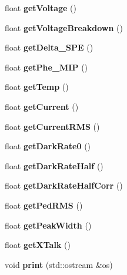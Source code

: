 \begin{DoxyCompactItemize}
\item 
float {\bfseries getVoltage} ()\label{classCALICE_1_1TilesItep_aafa1a1d65569c178442f2820be77b289}

\item 
float {\bfseries getVoltageBreakdown} ()\label{classCALICE_1_1TilesItep_a2010bc99a78518b307feee4257fd99d6}

\item 
float {\bfseries getDelta\_\-SPE} ()\label{classCALICE_1_1TilesItep_a993822f7f20966e669e13bdaacd6ef85}

\item 
float {\bfseries getPhe\_\-MIP} ()\label{classCALICE_1_1TilesItep_a35846842f8e7605fc8bb93bfb52c0f6c}

\item 
float {\bfseries getTemp} ()\label{classCALICE_1_1TilesItep_a404fc9ff07ba51ecf1399bed3ba4e80f}

\item 
float {\bfseries getCurrent} ()\label{classCALICE_1_1TilesItep_a455610d588f32d1db3d549dbdb141c11}

\item 
float {\bfseries getCurrentRMS} ()\label{classCALICE_1_1TilesItep_a19a98deda22ecd36e95a92b7e6b10470}

\item 
float {\bfseries getDarkRate0} ()\label{classCALICE_1_1TilesItep_a4337a0d37c55a087b0bdbfdd7e2193fc}

\item 
float {\bfseries getDarkRateHalf} ()\label{classCALICE_1_1TilesItep_abc4d44fb3229652f685fcb10f126dd95}

\item 
float {\bfseries getDarkRateHalfCorr} ()\label{classCALICE_1_1TilesItep_acc22ca8901fcdf15fa7e7c858f065a24}

\item 
float {\bfseries getPedRMS} ()\label{classCALICE_1_1TilesItep_abca9b88acfc9eca8808f20fc07508cbe}

\item 
float {\bfseries getPeakWidth} ()\label{classCALICE_1_1TilesItep_aade33716b5253d5873af04ba9ee8d6a2}

\item 
float {\bfseries getXTalk} ()\label{classCALICE_1_1TilesItep_a2531bbd09c0c70bfe43aadec23d23241}

\item 
void {\bf print} (std::ostream \&os)\label{classCALICE_1_1TilesItep_a267a95bfaf96cf6ef7341edafd00e6f0}


\end{DoxyCompactItemize}

